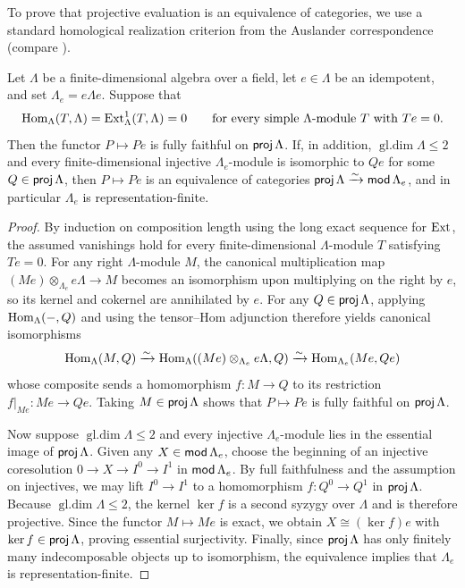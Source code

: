 To prove that projective evaluation is an equivalence of categories, we use a
standard homological realization criterion from the Auslander correspondence
(compare \cite[Theorem~3.3]{IyamaRealization}).

\begin{lemma}
\label{lem:projective-evaluation-criterion}
Let $\Lambda$ be a finite-dimensional algebra over a field, let $e\in\Lambda$
be an idempotent, and set $\Lambda_e=e\Lambda e$. Suppose that
\[
 \operatorname{Hom}_\Lambda(T,\Lambda)=\operatorname{Ext}^1_\Lambda(T,\Lambda)=0
 \qquad\text{for every simple $\Lambda$-module $T$ with }Te=0.
\]
Then the functor $P\mapsto Pe$ is fully faithful on $\operatorname{\mathsf{proj}}\Lambda$. If, in
addition, $\operatorname{gl.dim}\Lambda\leq2$ and every finite-dimensional
injective $\Lambda_e$-module is isomorphic to $Qe$ for some
$Q\in\operatorname{\mathsf{proj}}\Lambda$, then $P\mapsto Pe$ is an equivalence of categories
$\operatorname{\mathsf{proj}}\Lambda\xrightarrow{\sim}\operatorname{\mathsf{mod}}\Lambda_e$, and in particular
$\Lambda_e$ is representation-finite.
\end{lemma}
\begin{proof}
By induction on composition length using the long exact sequence for $\operatorname{Ext}$,
the assumed vanishings hold for every finite-dimensional $\Lambda$-module $T$
satisfying $Te=0$. For any right $\Lambda$-module $M$, the canonical
multiplication map $(Me)\otimes_{\Lambda_e}e\Lambda\to M$ becomes an
isomorphism upon multiplying on the right by $e$, so its kernel and cokernel
are annihilated by $e$. For any $Q\in\operatorname{\mathsf{proj}}\Lambda$, applying
$\operatorname{Hom}_\Lambda(-,Q)$ and using the tensor--Hom adjunction therefore yields
canonical isomorphisms
\[
 \operatorname{Hom}_\Lambda(M,Q)\xrightarrow{\sim}
 \operatorname{Hom}_\Lambda((Me)\otimes_{\Lambda_e}e\Lambda,Q)
 \xrightarrow{\sim}\operatorname{Hom}_{\Lambda_e}(Me,Qe)
\]
whose composite sends a homomorphism $f:M\to Q$ to its restriction
$f|_{Me}:Me\to Qe$. Taking $M\in\operatorname{\mathsf{proj}}\Lambda$ shows that $P\mapsto Pe$ is
fully faithful on $\operatorname{\mathsf{proj}}\Lambda$.

Now suppose $\operatorname{gl.dim}\Lambda\leq2$ and every injective
$\Lambda_e$-module lies in the essential image of $\operatorname{\mathsf{proj}}\Lambda$. Given any
$X\in\operatorname{\mathsf{mod}}\Lambda_e$, choose the beginning of an injective coresolution
$0\to X\to I^0\to I^1$ in $\operatorname{\mathsf{mod}}\Lambda_e$. By full faithfulness and the
assumption on injectives, we may lift $I^0\to I^1$ to a homomorphism
$f:Q^0\to Q^1$ in $\operatorname{\mathsf{proj}}\Lambda$. Because $\operatorname{gl.dim}\Lambda\leq2$,
the kernel $\ker f$ is a second syzygy over $\Lambda$ and is therefore
projective. Since the functor $M\mapsto Me$ is exact, we obtain
$X\cong(\ker f)e$ with $\ker f\in\operatorname{\mathsf{proj}}\Lambda$, proving essential
surjectivity. Finally, since $\operatorname{\mathsf{proj}}\Lambda$ has only finitely many
indecomposable objects up to isomorphism, the equivalence implies that
$\Lambda_e$ is representation-finite.
\end{proof}

